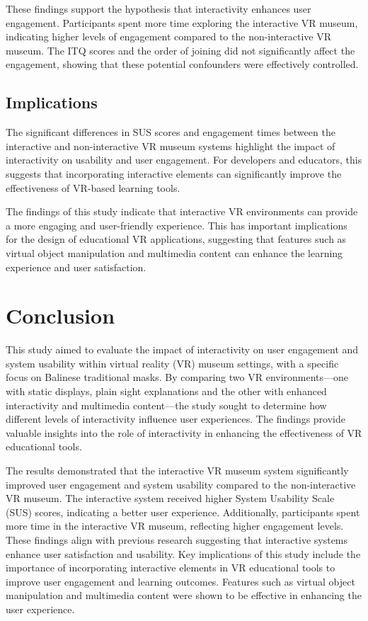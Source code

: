 \documentclass[conference]{IEEEtran}
\begin{document}
These findings support the hypothesis that interactivity enhances user engagement. Participants spent more time exploring the interactive VR museum, indicating higher levels of engagement compared to the non-interactive VR museum. The ITQ scores and the order of joining did not significantly affect the engagement, showing that these potential confounders were effectively controlled.

\subsection{Implications}

The significant differences in SUS scores and engagement times between the interactive and non-interactive VR museum systems highlight the impact of interactivity on usability and user engagement. For developers and educators, this suggests that incorporating interactive elements can significantly improve the effectiveness of VR-based learning tools.

The findings of this study indicate that interactive VR environments can provide a more engaging and user-friendly experience. This has important implications for the design of educational VR applications, suggesting that features such as virtual object manipulation and multimedia content can enhance the learning experience and user satisfaction.

\section{Conclusion}

This study aimed to evaluate the impact of interactivity on user engagement and system usability within virtual reality (VR) museum settings, with a specific focus on Balinese traditional masks. By comparing two VR environments—one with static displays, plain sight explanations and the other with enhanced interactivity and multimedia content—the study sought to determine how different levels of interactivity influence user experiences. The findings provide valuable insights into the role of interactivity in enhancing the effectiveness of VR educational tools.

The results demonstrated that the interactive VR museum system significantly improved user engagement and system usability compared to the non-interactive VR museum. The interactive system received higher System Usability Scale (SUS) scores, indicating a better user experience. Additionally, participants spent more time in the interactive VR museum, reflecting higher engagement levels. These findings align with previous research suggesting that interactive systems enhance user satisfaction and usability. Key implications of this study include the importance of incorporating interactive elements in VR educational tools to improve user engagement and learning outcomes. Features such as virtual object manipulation and multimedia content were shown to be effective in enhancing the user experience.
\end{document}
